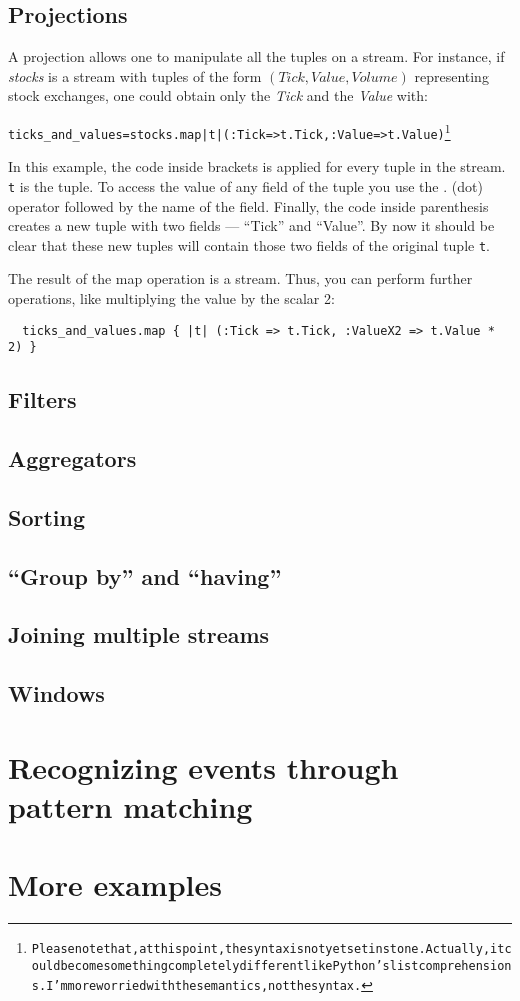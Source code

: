 \documentclass[twoside]{report}
\newcommand{\tuple}[1]{$(#1)$}
\begin{document}
\section{Projections}
A projection allows one to manipulate all the tuples on a stream. For instance, if \emph{stocks} is a stream with tuples of the form \tuple{Tick, Value, Volume} representing stock exchanges, one could obtain only the \emph{Tick} and the \emph{Value} with:
\begin{alltt}
  ticks_and_values = stocks.map { |t| (:Tick => t.Tick, :Value => t.Value) }\footnote{Please note that, at this point, the syntax is not yet set in stone. Actually, it could become something completely different like Python's list comprehensions. I'm more worried with the semantics, not the syntax.}
\end{alltt}
In this example, the code inside brackets is applied for every tuple in the stream. \verb=t= is the tuple. To access the value of any field of the tuple you use the . (dot) operator followed by the name of the field. Finally, the code inside parenthesis creates a new tuple with two fields --- ``Tick'' and ``Value''. By now it should be clear that these new tuples will contain those two fields of the original tuple \verb=t=.

The result of the map operation is a stream. Thus, you can perform further operations, like multiplying the value by the scalar 2:

\begin{verbatim}
  ticks_and_values.map { |t| (:Tick => t.Tick, :ValueX2 => t.Value * 2) }
\end{verbatim}

\section{Filters}
\section{Aggregators}
\section{Sorting}
\section{``Group by'' and ``having''}
\section{Joining multiple streams}
\section{Windows}

\chapter{Recognizing events through pattern matching}
\chapter{More examples}
\end{document}
